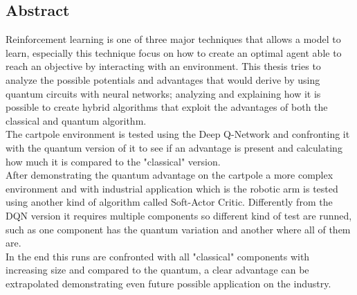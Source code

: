 \begin{center}
	\section*{Abstract}
\end{center}
Reinforcement learning is one of three major techniques that allows a model to learn, especially this technique focus on how to create an optimal agent able to reach an objective by interacting with an environment. This thesis tries to analyze the possible potentials and advantages that would derive by using quantum circuits with neural networks; analyzing and explaining how it is possible to create hybrid algorithms that exploit the advantages of both the classical and quantum algorithm.\\
The cartpole environment is tested using the Deep Q-Network and confronting it with the quantum version of it to see if an advantage is present and calculating how much it is compared to the "classical" version.\\
After demonstrating the quantum advantage on the cartpole a more complex environment and with industrial application which is the robotic arm is tested using another kind of algorithm called Soft-Actor Critic. Differently from the DQN version it requires multiple components so different kind of test are runned, such as one component has the quantum variation and another where all of them are.\\
In the end this runs are confronted with all "classical" components with increasing size and compared to the quantum, a clear advantage can be extrapolated demonstrating even future possible application on the industry.

